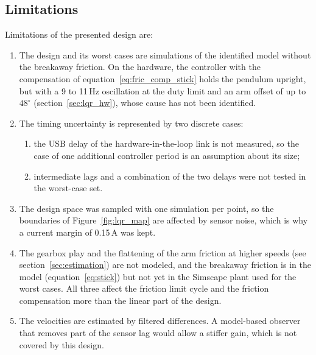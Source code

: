 \documentclass[a4paper,11pt]{article}
\begin{document}
\subsection{Limitations}
Limitations of the presented design are:
\begin{enumerate}
  \item The design and its worst cases are simulations of the identified model without the breakaway friction. On the hardware, the controller with the compensation of equation~\ref{eq:fric_comp_stick} holds the pendulum upright, but with a 9 to 11\,Hz oscillation at the duty limit and an arm offset of up to $48^\circ$ (section~\ref{sec:lqr_hw}), whose cause has not been identified.
  \item The timing uncertainty is represented by two discrete cases:
  \begin{enumerate}
    \item the USB delay of the hardware-in-the-loop link is not measured, so the case of one additional controller period is an assumption about its size;
    \item intermediate lags and a combination of the two delays were not tested in the worst-case set.
  \end{enumerate}
  \item The design space was sampled with one simulation per point, so the boundaries of Figure~\ref{fig:lqr_map} are affected by sensor noise, which is why a current margin of 0.15\,A was kept.
  \item The gearbox play and the flattening of the arm friction at higher speeds (see section~\ref{sec:estimation}) are not modeled, and the breakaway friction is in the model (equation~\ref{eq:stick}) but not yet in the Simscape plant used for the worst cases. All three affect the friction limit cycle and the friction compensation more than the linear part of the design.
  \item The velocities are estimated by filtered differences. A model-based observer that removes part of the sensor lag would allow a stiffer gain, which is not covered by this design.
\end{enumerate}

\end{document}
